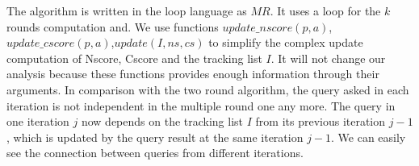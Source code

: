 The algorithm is written in the loop language as $MR$. 
It uses a loop for the $k$ rounds computation and. We use functions $update\_nscore(p,a)$,$update\_cscore(p,a)$,$update(I,ns,cs)$ to simplify the complex update computation of Nscore, Cscore and the tracking list $I$. It will not change our analysis because these functions provides enough information through their arguments.
In comparison with the two round algorithm, the query asked in each iteration is not independent  in the multiple round one any more. 
The query in one iteration $j$ now depends on the tracking list $I$ from its previous iteration $j-1$, which is updated by the query result at the same iteration $j-1$. We can easily see the connection between queries from different iterations.
%
%
%
%
